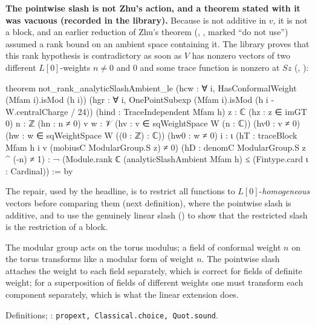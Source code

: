 \begin{warning}
\textbf{The pointwise slash is not Zhu's action, and a theorem stated with it was vacuous (recorded in the library).}
Because  is not additive in $v$, it is not a block, and an earlier reduction of Zhu's theorem
(\allowbreak{}\allowbreak{}, , marked ``do not use'') assumed a rank bound
on an ambient space containing it. The library proves that this rank hypothesis is contradictory as soon as $V$ has
nonzero vectors of two different $L[0]$-weights $n\neq0$ and $0$ and some trace function is nonzero at $Sz$
(\allowbreak{}, ):
\begin{leancode}
theorem not_rank_analyticSlashAmbient_le
    (hcw : ∀ i, HasConformalWeight (Mfam i).isMod (h i))
    (hgr : ∀ i, OnePointSubexp (Mfam i).isMod (h i - W.centralCharge / 24))
    (hind : TraceIndependent Mfam h)
    {z : ℂ} (hz : z ∈ imGT 0) {n : ℤ} (hn : n ≠ 0) {v w : 𝒱}
    (hv : v ∈ sqWeightSpace W (n : ℂ)) (hv0 : v ≠ 0)
    (hw : w ∈ sqWeightSpace W ((0 : ℤ) : ℂ)) (hw0 : w ≠ 0)
    {i : ι} (hT : traceBlock Mfam h i v (mobiusC ModularGroup.S z) ≠ 0)
    (hD : denomC ModularGroup.S z ^ (-n) ≠ 1) :
    ¬ (Module.rank ℂ (analyticSlashAmbient Mfam h) ≤ (Fintype.card ι : Cardinal)) := by
\end{leancode}
The repair, used by the headline, is to restrict all functions to $L[0]$-\emph{homogeneous} vectors before comparing them
(next definition), where the pointwise slash is additive, and to use the genuinely linear slash 
() to show that the restricted slash is the restriction of a block.
\end{warning}

\begin{physics}
The modular group acts on the torus modulus; a field of conformal weight $n$ on the torus transforms like a modular form
of weight $n$. The pointwise slash attaches the weight to each field separately, which is correct for fields of definite
weight; for a superposition of fields of different weights one must transform each component separately, which is what
the linear extension does.
\end{physics}

\begin{status}
Definitions; \allowbreak{}: \texttt{propext, Classical.choice, Quot.sound}.
\end{status}

